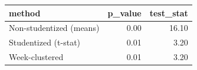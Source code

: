 \begin{tabular}{lrr}
\toprule
method & p\_value & test\_stat \\
\midrule
Non-studentized (means) & 0.00 & 16.10 \\
Studentized (t-stat) & 0.01 & 3.20 \\
Week-clustered & 0.01 & 3.20 \\
\bottomrule
\end{tabular}
